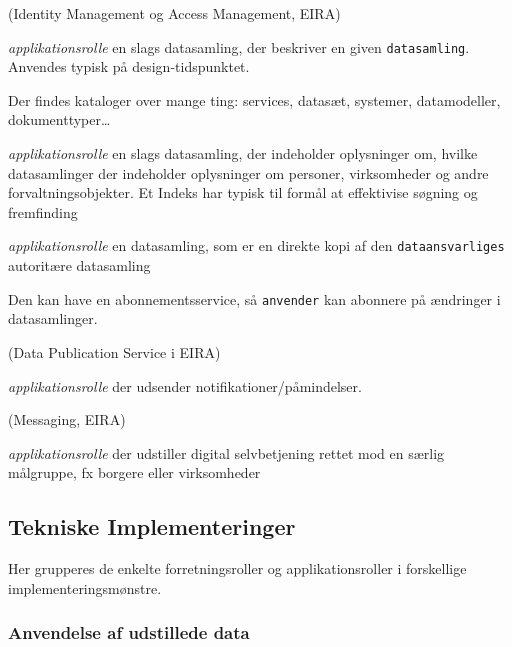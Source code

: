 (Identity Management og Access Management, EIRA)

\begin{description}
\tightlist
\item[Katalog]
\emph{applikationsrolle} en slags datasamling, der beskriver en given
\texttt{datasamling}. Anvendes typisk på design-tidspunktet.
\end{description}

Der findes kataloger over mange ting: services, datasæt, systemer,
datamodeller, dokumenttyper\ldots{}

\begin{description}
\tightlist
\item[Indeks]
\emph{applikationsrolle} en slags datasamling, der indeholder
oplysninger om, hvilke datasamlinger der indeholder oplysninger om
personer, virksomheder og andre forvaltningsobjekter. Et Indeks har
typisk til formål at effektivise søgning og fremfinding
\item[Kopi]
\emph{applikationsrolle} en datasamling, som er en direkte kopi af den
\texttt{dataansvarliges} autoritære datasamling
\end{description}

Den kan have en abonnementsservice, så \texttt{anvender} kan abonnere på
ændringer i datasamlinger.

(Data Publication Service i EIRA)

\begin{description}
\tightlist
\item[Notifikation]
\emph{applikationsrolle} der udsender notifikationer/påmindelser.
\end{description}

(Messaging, EIRA)

\begin{description}
\tightlist
\item[Portal]
\emph{applikationsrolle} der udstiller digital selvbetjening rettet mod
en særlig målgruppe, fx borgere eller virksomheder
\end{description}

\subsection{Tekniske Implementeringer}\label{tekniske-implementeringer}

Her grupperes de enkelte forretningsroller og applikationsroller i
forskellige implementeringsmønstre.

\subsubsection{Anvendelse af udstillede
data}\label{anvendelse-af-udstillede-data}

